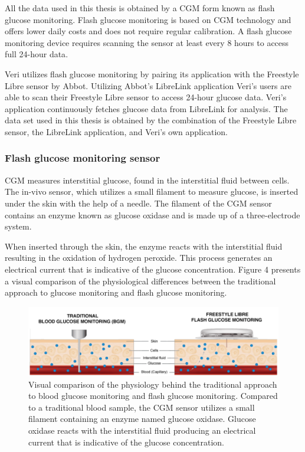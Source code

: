 \documentclass[english, 12pt, a4paper, elec, utf8, a-1b, online]{aaltothesis}
\begin{document}
All the data used in this thesis is obtained by a CGM form known as flash glucose monitoring.
Flash glucose monitoring is based on CGM technology and offers lower daily costs and does not require regular calibration.
A flash glucose monitoring device requires scanning the sensor at least every 8 hours to access 
full 24-hour data\cite{petrie_improving_2017}. 

Veri utilizes flash glucose monitoring by pairing its application with the Freestyle Libre sensor by Abbot. Utilizing Abbot's LibreLink
application Veri's users are able to scan their Freestyle Libre sensor to access 24-hour glucose data. 
Veri's application continuously fetches glucose data from LibreLink for analysis. The data set used in this 
thesis is obtained by the combination of the Freestyle Libre sensor, the LibreLink application, and Veri's own application.


\subsubsection{Flash glucose monitoring sensor}
CGM measures interstitial glucose, found in the interstitial fluid between cells. 
The in-vivo sensor, which utilizes a small filament to measure glucose, is inserted under the skin with the help of a needle. 
The filament of the CGM sensor contains an enzyme known as glucose oxidase and is made up of a three-electrode system\cite{schmelzeisen-redeker_overview_2013}. 

When inserted through the skin, the enzyme reacts with the interstitial fluid resulting in the oxidation of hydrogen peroxide. 
This process generates an electrical current that is indicative of the glucose concentration\cite{schmelzeisen-redeker_overview_2013}.
Figure 4 presents a visual comparison of the physiological differences between the traditional approach to glucose monitoring and flash 
glucose monitoring. 

\begin{figure}[H]
\centering
\includegraphics[width=15cm]{images/cgm.png}
\caption{Visual comparison of the physiology behind the traditional approach to blood glucose monitoring and flash glucose monitoring\cite{freestyle_cgm}. Compared to a traditional blood sample, the CGM sensor utilizes a small filament containing an enzyme named glucose oxidase. Glucose oxidase reacts with the 
interstitial fluid producing an electrical current that is indicative of the glucose concentration.}
\end{figure}
\end{document}
